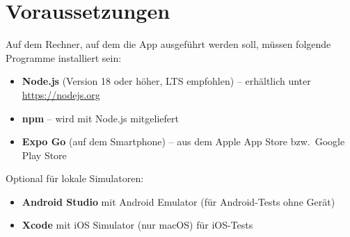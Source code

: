 \section{Voraussetzungen}
Auf dem Rechner, auf dem die App ausgeführt werden soll, müssen folgende Programme installiert sein:

\begin{itemize}
  \item \textbf{Node.js} (Version 18 oder höher, LTS empfohlen) -- erhältlich unter \url{https://nodejs.org}
  \item \textbf{npm} -- wird mit Node.js mitgeliefert
  \item \textbf{Expo Go} (auf dem Smartphone) -- aus dem Apple App Store bzw.\ Google Play Store
\end{itemize}

Optional für lokale Simulatoren:
\begin{itemize}
  \item \textbf{Android Studio} mit Android Emulator (für Android-Tests ohne Gerät)
  \item \textbf{Xcode} mit iOS Simulator (nur macOS) für iOS-Tests
\end{itemize}
